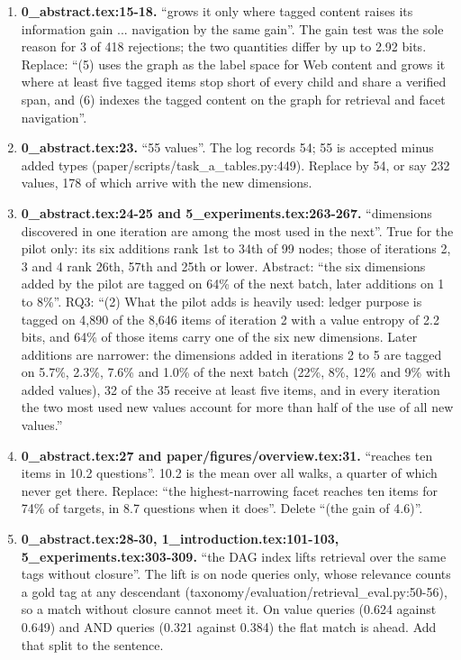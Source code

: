 \documentclass[10pt,a4paper]{article}
\begin{document}
{\small\sloppy
\begin{enumerate}[leftmargin=1.8em,itemsep=0.45em]
\item \textbf{0\_abstract.tex:15-18.} ``grows it only where tagged content raises its information gain ... navigation by the same gain''. The gain test was the sole reason for 3 of 418 rejections; the two quantities differ by up to 2.92 bits. Replace: ``(5) uses the graph as the label space for Web content and grows it where at least five tagged items stop short of every child and share a verified span, and (6) indexes the tagged content on the graph for retrieval and facet navigation''.
\item \textbf{0\_abstract.tex:23.} ``55 values''. The log records 54; 55 is accepted minus added types (paper/scripts/\allowbreak{}task\_a\_tables.py:449). Replace by 54, or say 232 values, 178 of which arrive with the new dimensions.
\item \textbf{0\_abstract.tex:24-25 and 5\_experiments.tex:263-267.} ``dimensions discovered in one iteration are among the most used in the next''. True for the pilot only: its six additions rank 1st to 34th of 99 nodes; those of iterations 2, 3 and 4 rank 26th, 57th and 25th or lower. Abstract: ``the six dimensions added by the pilot are tagged on 64\% of the next batch, later additions on 1 to 8\%''. RQ3: ``(2) What the pilot adds is heavily used: ledger purpose is tagged on 4,890 of the 8,646 items of iteration 2 with a value entropy of 2.2 bits, and 64\% of those items carry one of the six new dimensions. Later additions are narrower: the dimensions added in iterations 2 to 5 are tagged on 5.7\%, 2.3\%, 7.6\% and 1.0\% of the next batch (22\%, 8\%, 12\% and 9\% with added values), 32 of the 35 receive at least five items, and in every iteration the two most used new values account for more than half of the use of all new values.''
\item \textbf{0\_abstract.tex:27 and paper/figures/overview.tex:31.} ``reaches ten items in 10.2 questions''. 10.2 is the mean over all walks, a quarter of which never get there. Replace: ``the highest-narrowing facet reaches ten items for 74\% of targets, in 8.7 questions when it does''. Delete ``(the gain of 4.6)''.
\item \textbf{0\_abstract.tex:28-30, 1\_introduction.tex:101-103, 5\_experiments.tex:303-309.} ``the DAG index lifts retrieval over the same tags without closure''. The lift is on node queries only, whose relevance counts a gold tag at any descendant (taxonomy/evaluation/retrieval\_eval.py:50-56), so a match without closure cannot meet it. On value queries (0.624 against 0.649) and AND queries (0.321 against 0.384) the flat match is ahead. Add that split to the sentence.

\end{enumerate}}
\end{document}
